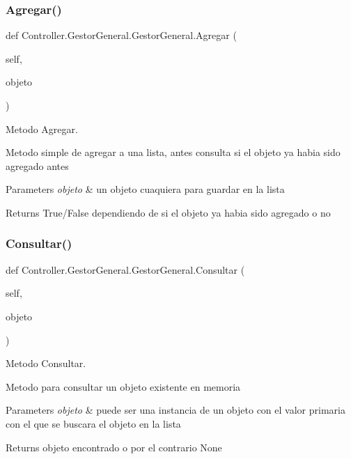 \subsubsection{\texorpdfstring{Agregar()}{Agregar()}}
{\footnotesize\ttfamily def Controller.\+Gestor\+General.\+Gestor\+General.\+Agregar (\begin{DoxyParamCaption}\item[{}]{self,  }\item[{}]{objeto }\end{DoxyParamCaption})}



Metodo Agregar. 

Metodo simple de agregar a una lista, antes consulta si el objeto ya habia sido agregado antes 
\begin{DoxyParams}{Parameters}
{\em objeto} & un objeto cuaquiera para guardar en la lista \\
\hline
\end{DoxyParams}
\begin{DoxyReturn}{Returns}
True/\+False dependiendo de si el objeto ya habia sido agregado o no 
\end{DoxyReturn}
\mbox{\label{class_controller_1_1_gestor_general_1_1_gestor_general_a4a1ebb934efd98e4d1ffd065144c0427}} 
\subsubsection{\texorpdfstring{Consultar()}{Consultar()}}
{\footnotesize\ttfamily def Controller.\+Gestor\+General.\+Gestor\+General.\+Consultar (\begin{DoxyParamCaption}\item[{}]{self,  }\item[{}]{objeto }\end{DoxyParamCaption})}



Metodo Consultar. 

Metodo para consultar un objeto existente en memoria 
\begin{DoxyParams}{Parameters}
{\em objeto} & puede ser una instancia de un objeto con el valor primaria con el que se buscara el objeto en la lista \\
\hline
\end{DoxyParams}
\begin{DoxyReturn}{Returns}
objeto encontrado o por el contrario None 
\end{DoxyReturn}
\mbox{\label{class_controller_1_1_gestor_general_1_1_gestor_general_a15a6db0b2a80304807dbfb1b0ea5a8e7}} 
